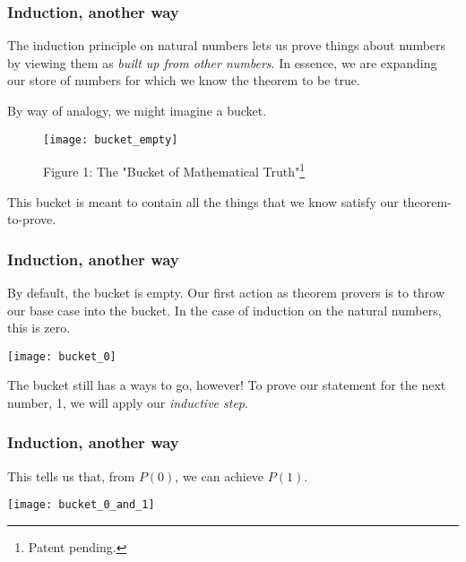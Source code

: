 \documentclass[aspectratio=169, handout]{beamer}
\begin{document}

\begin{frame}[fragile]
  \frametitle{Induction, another way}

  The induction principle on natural numbers lets us prove things about numbers by
  viewing them as \textit{built up from other numbers}. In essence, we are expanding our
  store of numbers for which we know the theorem to be true.

  \pause
  \vspace{\fill}

  By way of analogy, we might imagine a bucket.

  \pause
  \begin{figure}
    \centering
    \texttt{[image: bucket\_empty]}
    \caption{Figure 1: The "Bucket of Mathematical Truth"\footnote{Patent pending.}}
  \end{figure}
  \pause
  This bucket is meant to contain all the things that we know satisfy our theorem-to-prove.
\end{frame}

\begin{frame}[fragile]
  \frametitle{Induction, another way}

  By default, the bucket is empty. Our first action as theorem provers is to throw our base case
  into the bucket. In the case of induction on the natural numbers, this is zero.

  \pause
  \vspace{\fill}

  \begin{center}
    \texttt{[image: bucket\_0]}
  \end{center}

  \pause
  \vspace{\fill}

  The bucket still has a ways to go, however! To prove our statement for the next number, 1, we
  will apply our \textit{inductive step}.
\end{frame}

\begin{frame}[fragile]
  \frametitle{Induction, another way}

  This tells us that, from $P(0)$, we can achieve $P(1)$.

  \pause
  \vspace{\fill}

  \begin{center} \texttt{[image: bucket\_0\_and\_1]} \end{center}
\end{frame}
\end{document}
